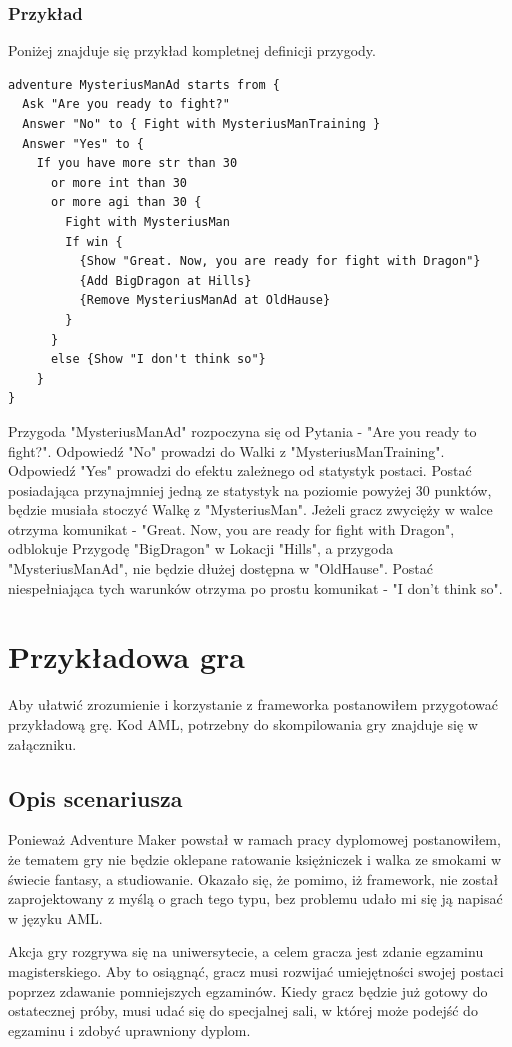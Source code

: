 \documentclass{xmgr}
\begin{document}
\subsection{Przykład}
Poniżej znajduje się przykład kompletnej definicji przygody.
\begin{lstlisting}
adventure MysteriusManAd starts from {
  Ask "Are you ready to fight?"
  Answer "No" to { Fight with MysteriusManTraining }
  Answer "Yes" to {
    If you have more str than 30 
      or more int than 30 
      or more agi than 30 {
        Fight with MysteriusMan
        If win {
          {Show "Great. Now, you are ready for fight with Dragon"}
          {Add BigDragon at Hills}
          {Remove MysteriusManAd at OldHause}
        }
      }
      else {Show "I don't think so"}
    }
}
\end{lstlisting}
Przygoda "MysteriusManAd" rozpoczyna się od Pytania - "Are you ready to fight?". Odpowiedź "No" prowadzi do Walki z "MysteriusManTraining".
Odpowiedź "Yes" prowadzi do efektu zależnego od statystyk postaci. Postać posiadająca przynajmniej jedną ze statystyk na poziomie powyżej 30 punktów, będzie musiała stoczyć Walkę z "MysteriusMan". Jeżeli gracz zwycięży w walce otrzyma komunikat - "Great. Now, you are ready for fight with Dragon", odblokuje Przygodę "BigDragon" w Lokacji "Hills", a przygoda "MysteriusManAd", nie będzie dłużej dostępna w "OldHause". Postać niespełniająca tych warunków otrzyma po prostu komunikat - "I don't think so". 

\chapter{Przykładowa gra}
Aby ułatwić zrozumienie i korzystanie z frameworka postanowiłem przygotować przykładową grę. Kod AML, potrzebny do skompilowania gry znajduje się w załączniku.

\section{Opis scenariusza}

Ponieważ Adventure Maker powstał w ramach pracy dyplomowej postanowiłem, że tematem gry nie będzie oklepane ratowanie księżniczek i walka ze smokami w świecie fantasy, a studiowanie. Okazało się, że pomimo, iż framework, nie został zaprojektowany z myślą o grach tego typu, bez problemu udało mi się ją napisać w języku AML.

Akcja gry rozgrywa się na uniwersytecie, a celem gracza jest zdanie egzaminu magisterskiego. Aby to osiągnąć, gracz musi rozwijać umiejętności swojej postaci poprzez zdawanie pomniejszych egzaminów. Kiedy gracz będzie już gotowy do ostatecznej próby, musi udać się do specjalnej sali, w której może podejść do egzaminu i zdobyć uprawniony dyplom.
\end{document}
